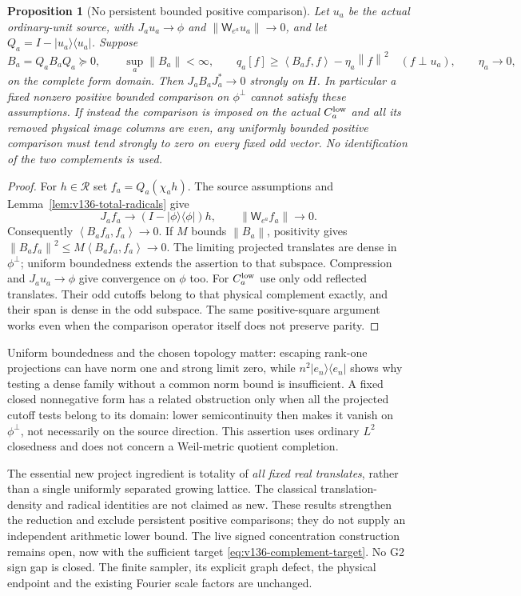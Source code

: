 \documentclass[11pt]{article}
\newtheorem{proposition}[theorem]{Proposition}
\theoremstyle{remark}
\newcommand{\norm}[1]{\left\lVert #1\right\rVert}
\newcommand{\ip}[2]{\left\langle #1,#2\right\rangle}
\begin{document}
\begin{proposition}[No persistent bounded positive comparison]
\label{prop:v136-positive-comparison}
Let $u_a$ be the actual ordinary-unit source, with $J_au_a\to\phi$
and $\norm{\mathsf W_{e^a}u_a}\to0$, and let
$Q_a=I-|u_a\rangle\langle u_a|$. Suppose
\[
 B_a=Q_aB_aQ_a\succeq0,\qquad\sup_a\norm{B_a}<\infty,
 \qquad
 q_a[f]\ge\ip{B_af}{f}-\eta_a\norm f^2\quad(f\perp u_a),
 \qquad\eta_a\to0,
\]
on the complete form domain. Then
$J_aB_aJ_a^*\to0$ strongly on $H$.
In particular a fixed nonzero positive bounded comparison on
$\phi^\perp$ cannot satisfy these assumptions.
If instead the comparison is imposed on the actual $C_a^{\rm low}$
and all its removed physical image columns are even, any uniformly
bounded positive comparison must tend strongly to zero on every
fixed odd vector. No identification of the two complements is used.
\end{proposition}
\begin{proof}
For $h\in\mathcal R$ set $f_a=Q_a(\chi_a h)$. The source assumptions
and Lemma~\ref{lem:v136-total-radicals} give
\[
 J_af_a\longrightarrow(I-|\phi\rangle\langle\phi|)h,
 \qquad\norm{\mathsf W_{e^a}f_a}\longrightarrow0.
\]
Consequently $\ip{B_af_a}{f_a}\to0$. If $M$ bounds $\norm{B_a}$,
positivity gives $\norm{B_af_a}^2\le M\ip{B_af_a}{f_a}\to0$.
The limiting projected translates are dense in $\phi^\perp$;
uniform boundedness extends the assertion to that subspace.
Compression and $J_au_a\to\phi$ give convergence on $\phi$ too.
For $C_a^{\rm low}$ use only odd reflected translates. Their odd
cutoffs belong to that physical complement exactly, and their span
is dense in the odd subspace. The same positive-square argument works
even when the comparison operator itself does not preserve parity.
\end{proof}

Uniform boundedness and the chosen topology matter: escaping rank-one
projections can have norm one and strong limit zero, while
$n^2|e_n\rangle\langle e_n|$ shows why testing a dense family without
a common norm bound is insufficient. A fixed closed nonnegative form
has a related obstruction only when all the projected cutoff tests
belong to its domain: lower semicontinuity then makes it vanish on
$\phi^\perp$, not necessarily on the source direction. This assertion
uses ordinary $L^2$ closedness and does not concern a Weil-metric
quotient completion.

The essential new project ingredient is totality of \emph{all fixed real
translates}, rather than a single uniformly separated growing lattice.
The classical translation-density and radical identities are not claimed
as new. These results strengthen the reduction and exclude persistent
positive comparisons; they do not supply an independent arithmetic
lower bound. The live signed concentration construction remains open,
now with the sufficient target \eqref{eq:v136-complement-target}.
No G2 sign gap is closed. The finite sampler, its explicit graph defect,
the physical endpoint and the existing Fourier scale factors are unchanged.
\end{document}
